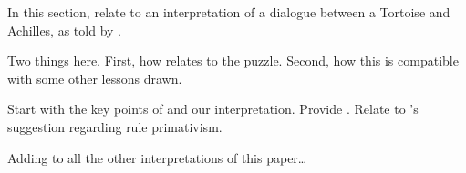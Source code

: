 \begin{note}
  In this section, relate  to an interpretation of a dialogue between a Tortoise and Achilles, as told by \textcite{Carroll:1895uj}.

  Two things here.
  First, how  relates to the puzzle.
  Second, how this is compatible with some other lessons drawn.

  Start with the key points of \textcite{Carroll:1895uj} and our interpretation.
  Provide .
  Relate to \citeauthor{Boghossian:2008vf}'s suggestion regarding rule primativism.
\end{note}

\begin{note}
  \color{red}
  Adding to all the other interpretations of this paper\dots
\end{note}

